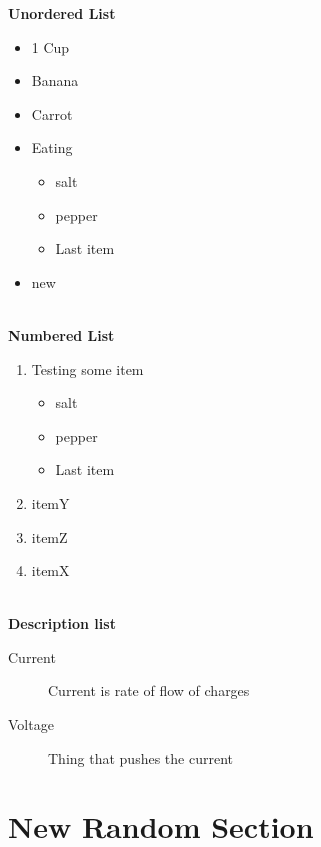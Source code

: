 \documentclass[a4paper,12pt]{book}
\begin{document}
\textbf{Unordered List}
\begin{itemize}
	\item 1 Cup
	\item Banana
	\item Carrot
	\item Eating
	\begin{itemize}
		\item salt
		\item pepper
		\item Last item
	\end{itemize}
	\item new
\end{itemize}
\  \\ %
\textbf{Numbered List}
\begin{enumerate}[label=\Roman*, font=\bfseries]
	\item Testing some item
	\begin{itemize}
		\item salt
		\item pepper
		\item Last item
	\end{itemize}
	\item itemY
	\item itemZ
	\item itemX
\end{enumerate}
\  \\ 
\textbf{Description list}
\begin{description}
	\item[Current] Current is rate of flow of charges
	\item[Voltage] Thing that pushes the current
\end{description}

\section{New Random Section}
\blindmathtrue %
\blindtext[5]
\pagebreak
\end{document}
